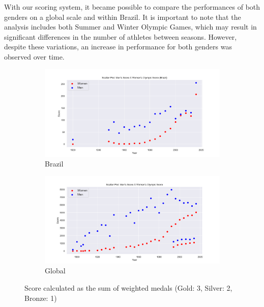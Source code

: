 \documentclass{article}
\begin{document}
With our scoring system, it became possible to compare the performances of both genders on a global scale and within Brazil. It is important to note that the analysis includes both Summer and Winter Olympic Games, which may result in significant differences in the number of athletes between seasons. However, despite these variations, an increase in performance for both genders was observed over time.

\begin{figure}[h]
    \centering
    \begin{subfigure}[b]{0.49\textwidth}
        \centering
        \includegraphics[width=\linewidth]{images/female_participation/scatterplot_olymp_score_bra.png} 
        \caption{Brazil}
        \label{fig:image1}
    \end{subfigure}
    \begin{subfigure}[b]{0.49\textwidth}
        \centering
        \includegraphics[width=\linewidth]{images/female_participation/scatterplot_olymp_score_global.png} 
        \caption{Global}
        \label{fig:image2}
    \end{subfigure}
    \caption{Score calculated as the sum of weighted medals (Gold: 3, Silver: 2, Bronze: 1)}
    \label{fig:sidebyside}
\end{figure}
\end{document}
